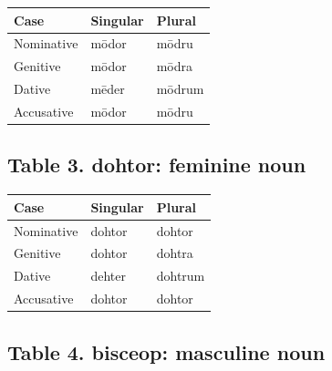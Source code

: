 \par\begingroup
\fontsize{10.5}{13.2}\selectfont
\setlength{\LTleft}{0pt}\setlength{\LTright}{\fill}
\noindent
\begin{tabular}{@{}>{\raggedright\arraybackslash}p{39.46mm}>{\raggedright\arraybackslash}p{39.46mm}>{\raggedright\arraybackslash}p{39.46mm}@{}}
\toprule
\textbf{Case} & \textbf{Singular} & \textbf{Plural} \\
\midrule
Nominative & mōdor & mōdru \\
Genitive & mōdor & mōdra \\
Dative & mēder & mōdrum \\
Accusative & mōdor & mōdru \\
\bottomrule
\end{tabular}
\par\endgroup

\subsection*{Table 3. dohtor: feminine noun}

\par\begingroup
\fontsize{10.5}{13.2}\selectfont
\setlength{\LTleft}{0pt}\setlength{\LTright}{\fill}
\noindent
\begin{tabular}{@{}>{\raggedright\arraybackslash}p{39.46mm}>{\raggedright\arraybackslash}p{39.46mm}>{\raggedright\arraybackslash}p{39.46mm}@{}}
\toprule
\textbf{Case} & \textbf{Singular} & \textbf{Plural} \\
\midrule
Nominative & dohtor & dohtor \\
Genitive & dohtor & dohtra \\
Dative & dehter & dohtrum \\
Accusative & dohtor & dohtor \\
\bottomrule
\end{tabular}
\par\endgroup

\subsection*{Table 4. bisceop: masculine noun}

